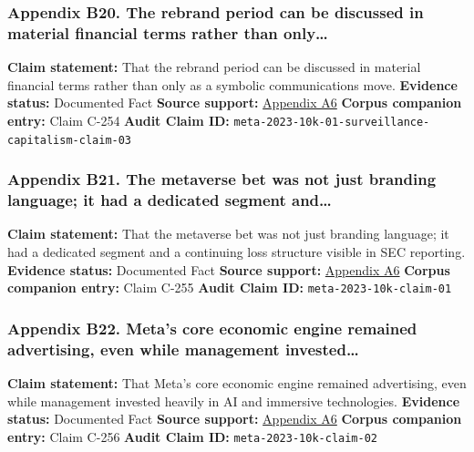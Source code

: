 \documentclass[
  american,
  11pt,
  letterpaper,
]{article}
\begin{document}
\subsubsection{Appendix B20. The rebrand period can be discussed in
material financial terms rather than
only\ldots{}}\label{appendix-b20-the-rebrand-period-can-be-discussed-in-material-financial-terms-rather-than-only}

\textbf{Claim statement:} That the rebrand period can be discussed in
material financial terms rather than only as a symbolic communications
move. \textbf{Evidence status:} Documented Fact \textbf{Source support:}
\hyperref[appendix-a6-meta-platforms-inc-2023-annual-report-form-10-k]{Appendix
A6} \textbf{Corpus companion entry:} Claim C-254 \textbf{Audit Claim
ID:} \texttt{meta-2023-10k-01-surveillance-capitalism-claim-03}

\subsubsection{Appendix B21. The metaverse bet was not just branding
language; it had a dedicated segment
and\ldots{}}\label{appendix-b21-the-metaverse-bet-was-not-just-branding-language-it-had-a-dedicated-segment-and}

\textbf{Claim statement:} That the metaverse bet was not just branding
language; it had a dedicated segment and a continuing loss structure
visible in SEC reporting. \textbf{Evidence status:} Documented Fact
\textbf{Source support:}
\hyperref[appendix-a6-meta-platforms-inc-2023-annual-report-form-10-k]{Appendix
A6} \textbf{Corpus companion entry:} Claim C-255 \textbf{Audit Claim
ID:} \texttt{meta-2023-10k-claim-01}

\subsubsection{Appendix B22. Meta's core economic engine remained
advertising, even while management
invested\ldots{}}\label{appendix-b22-meta-s-core-economic-engine-remained-advertising-even-while-management-invested}

\textbf{Claim statement:} That Meta's core economic engine remained
advertising, even while management invested heavily in AI and immersive
technologies. \textbf{Evidence status:} Documented Fact \textbf{Source
support:}
\hyperref[appendix-a6-meta-platforms-inc-2023-annual-report-form-10-k]{Appendix
A6} \textbf{Corpus companion entry:} Claim C-256 \textbf{Audit Claim
ID:} \texttt{meta-2023-10k-claim-02}
\end{document}
